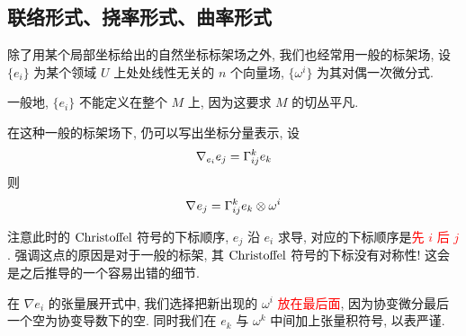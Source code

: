 \subsection{联络形式、挠率形式、曲率形式}
    除了用某个局部坐标给出的自然坐标标架场之外, 我们也经常用一般的标架场, 
    设 $\{e_i\}$ 为某个领域 $U$ 上处处线性无关的 $n$ 个向量场, 
    $\{\omega^i\}$ 为其对偶一次微分式.
    \begin{remark}
        一般地, $\{e_i\}$ 不能定义在整个 $M$ 上, 因为这要求 $M$ 的切丛平凡.
    \end{remark}
    在这种一般的标架场下, 仍可以写出坐标分量表示, 设
    \begin{equation*}
        \nabla_{e_i}{e_j} = \Gamma_{ij}^{k}e_k
    \end{equation*}
    则
    \begin{equation*}
        \nabla_{}{e_j} = \Gamma_{ij}^{k}e_k\otimes\omega^i
    \end{equation*}
    \begin{remark}[1]
        注意此时的 $\rm{Christoffel}$ 符号的下标顺序, $e_j$ 沿 $e_i$ 求导, 
        对应的下标顺序是\textcolor{red}{先 $i$ 后 $j$}. 
        强调这点的原因是对于一般的标架, 其 $\rm{Christoffel}$ 符号的下标没有对称性! 
        这会是之后推导的一个容易出错的细节. 
    \end{remark}
    \begin{remark}[2]
        在 $\nabla e_i$ 的张量展开式中, 我们选择把新出现的 $\omega^i$ \textcolor{red}{放在最后面}, 
        因为协变微分最后一个空为协变导数下的空. 
        同时我们在 $e_k$ 与 $\omega^k$ 中间加上张量积符号, 以表严谨. 
    \end{remark}
